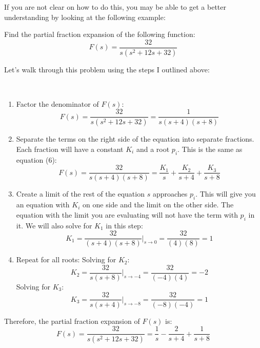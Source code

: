 \documentclass{article}
\theoremstyle{mytheoremstyle}
\theoremstyle{mytheoremstyle}
\theoremstyle{myproblemstyle}
\theoremstyle{break}
\begin{document}
If you are not clear on how to do this, you may be able to get a better understanding by looking at the following example:
\begin{problem}
Find the partial fraction expansion of the following function:
\begin{equation}
	F(s) = \frac{32}{s(s^2 + 12s + 32)}
\end{equation}
\end{problem}
Let's walk through this problem using the steps I outlined above:
\begin{solution}[\textcolor{blue}{Distinct Real Roots}]~
	\begin{enumerate}
		\item Factor the denominator of $F(s)$:
		      \begin{equation}
			      F(s) = \frac{32}{s(s^2 + 12s + 32)} = \frac{1}{s(s+4)(s+8)}
		      \end{equation}
		\item Separate the terms on the right side of the equation into separate fractions. Each fraction will have a constant $K_i$ and a root $p_i$. This is the same as equation (6):
		      \begin{equation}
			      F(s) = \frac{32}{s(s+4)(s+8)} = \frac{K_1}{s} + \frac{K_2}{s+4} + \frac{K_3}{s+8}
		      \end{equation}
		\item Create a limit of the rest of the equation $s$ approaches $p_i$. This will give you an equation with $K_i$ on one side and the limit on the other side. The equation with the limit you are evaluating will not have the term with $p_i$ in it. We will also solve for $K_1$ in this step:
		      \begin{equation}
			      K_1 = \frac{32}{(s+4)(s+8)} \Big|_{s \to 0} = \frac{32}{(4)(8)} = 1
		      \end{equation}
		\item Repeat for all roots:
		      \subitem Solving for $K_2$:
		      \begin{equation}
			      K_2 = \frac{32}{s(s+8)} \Big|_{s \to -4} = \frac{32}{(-4)(4)} = -2
		      \end{equation}
		      \subitem Solving for $K_3$:
		      \begin{equation}
			      K_3 = \frac{32}{s(s+4)} \Big|_{s \to -8} = \frac{32}{(-8)(-4)} = 1
		      \end{equation}
	\end{enumerate}
	Therefore, the partial fraction expansion of $F(s)$ is:
	\begin{equation}
		F(s) = \frac{32}{s(s^2 + 12s + 32)} = \frac{1}{s} - \frac{2}{s+4} + \frac{1}{s+8}
	\end{equation}
\end{solution}
\end{document}
